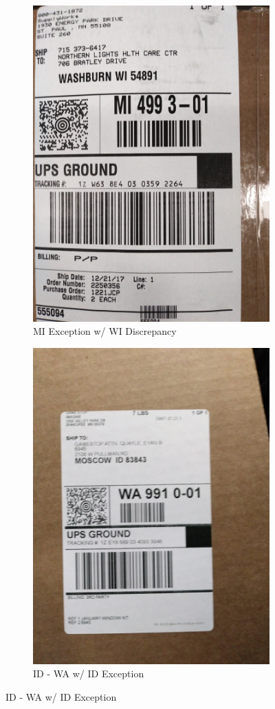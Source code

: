 \documentclass[12pt]{article}
\begin{document}
\begin{figure}[H]
\begin{subfigure}{0.5\textwidth}
\includegraphics[width=0.7\linewidth]{20171221_200431} 
\caption{MI Exception w/ WI Discrepancy}
\end{subfigure}
\begin{subfigure}{0.5\textwidth}
\centering
\includegraphics[width=0.7\linewidth]{20171221_180122} 
\caption{ID - WA w/ ID Exception}

\end{subfigure}
\end{figure}
\end{document}
